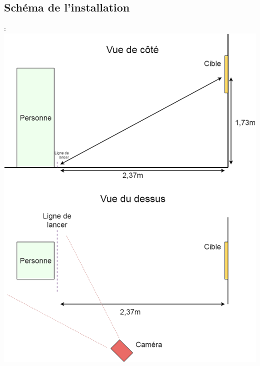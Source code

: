\documentclass[svgnames]{beamer}
\begin{document}
	\subsection{Schéma de l'installation}
	\begin{frame}{\secname : \subsecname}
		\centering
		\includegraphics[scale=0.2]{img/Darts_scheme.png}
	\end{frame}
	
\end{document}
